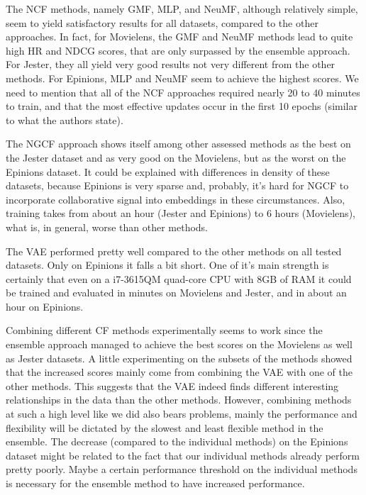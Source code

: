 
The NCF methods, namely GMF, MLP, and NeuMF, although relatively simple, seem to yield satisfactory results for all datasets, compared to the other approaches. 
In fact, for Movielens, the GMF and NeuMF methods lead to quite high HR and NDCG scores, that are only surpassed by the ensemble approach.
For Jester, they all yield very good results not very different from the other methods.
For Epinions, MLP and NeuMF seem to achieve the highest scores.
We need to mention that all of the NCF approaches required nearly 20 to 40 minutes to train, and that the most effective updates occur in the first 10 epochs (similar to what the authors state).


The NGCF approach shows itself among other assessed methods as the best on the Jester dataset 
and as very good on the Movielens, but as the worst on the Epinions dataset.
It could be explained with differences in density of these datasets, because
Epinions is very sparse and, probably, it's hard for NGCF to incorporate 
collaborative signal into embeddings in these circumstances.
Also, training takes from about an hour (Jester and Epinions) to 6 hours (Movielens),
what is, in general, worse than other methods.

The VAE performed pretty well compared to the other methods on all tested datasets. 
Only on Epinions it falls a bit short. 
One of it's main strength is certainly that even on a i7-3615QM quad-core CPU with 8GB of RAM it could be trained and evaluated in minutes on Movielens and Jester, and in about an hour on Epinions.

Combining different CF methods experimentally seems to work since the ensemble approach managed to achieve the best scores on the Movielens as well as Jester datasets. 
A little experimenting on the subsets of the methods showed that the increased scores mainly  come from combining the VAE with one of the other methods. 
This suggests that the VAE indeed finds different interesting relationships in the data than the other methods. 
However, combining methods at such a high level like we did also bears problems, mainly the performance and flexibility will be dictated by the slowest and least flexible method in the ensemble. 
The decrease (compared to the individual methods) on the Epinions dataset might be related to the fact that our individual methods already perform pretty poorly. 
Maybe a certain performance threshold on the individual methods is necessary for the ensemble method to have increased performance.


